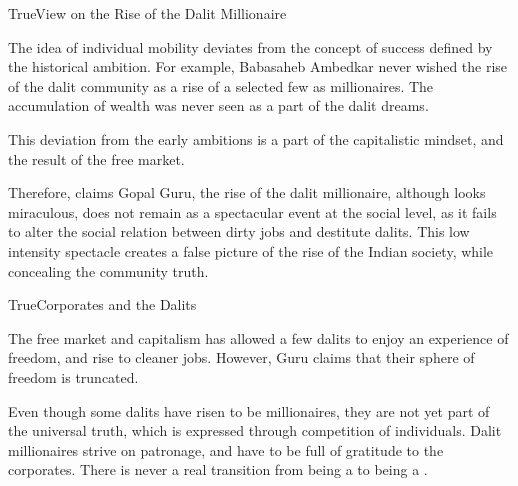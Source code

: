 \documentclass[11pt]{article}
\begin{document}
\begin{heading}{True}{}{View on the Rise of the Dalit Millionaire}
\begin{enumerate}[label=\bt{\theenumi.}]

			The idea of individual mobility deviates from the concept of success defined by the historical ambition. For example, Babasaheb Ambedkar never wished the rise of the dalit community as a rise of a selected few as millionaires. The accumulation of wealth was never seen as a part of the dalit dreams.

			This deviation from the early ambitions is a part of the capitalistic mindset, and the result of the free market.

	\end{enumerate}

	Therefore, claims Gopal Guru, the rise of the dalit millionaire, although looks miraculous, does not remain as a spectacular event at the social level, as it fails to alter the social relation between dirty jobs and destitute dalits. This low intensity spectacle creates a false picture of the rise of the Indian society, while concealing the community truth.

\end{heading}

\begin{heading}{True}{}{Corporates and the Dalits}

	The free market and capitalism has allowed a few dalits to enjoy an experience of freedom, and rise to cleaner jobs. However, Guru claims that their sphere of freedom is truncated.

	Even though some dalits have risen to be millionaires, they are not yet part of the universal truth, which is expressed through competition of individuals. Dalit millionaires strive on patronage, and have to be full of gratitude to the corporates. There is never a real transition from being a  to being a .

\end{heading}
\end{document}
